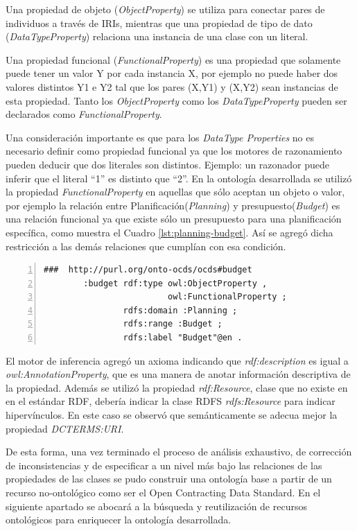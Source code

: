 Una propiedad de objeto (\textit{ObjectProperty}) se utiliza para conectar pares de individuos a través de IRIs, mientras que una propiedad de tipo de dato (\textit{DataTypeProperty}) relaciona una instancia de una clase con un literal.

Una propiedad funcional (\textit{FunctionalProperty}) es una propiedad que solamente puede tener un valor Y por cada instancia X, por ejemplo no puede haber dos valores distintos Y1 e Y2 tal que los pares (X,Y1) y (X,Y2) sean instancias de esta propiedad. Tanto los \textit{ObjectProperty} como los \textit{DataTypeProperty} pueden ser declarados como \textit{FunctionalProperty}.

Una consideración importante es que para los \textit{DataType Properties} no es necesario definir como propiedad funcional ya que los motores de razonamiento pueden deducir que dos literales son distintos. Ejemplo: un razonador puede inferir que  el literal “1” es distinto que “2”.
En la ontología desarrollada se utilizó la propiedad \textit{FunctionalProperty} en aquellas que sólo aceptan un objeto o valor, por ejemplo la relación entre Planificación(\textit{Planning}) y presupuesto(\textit{Budget}) es una relación funcional ya que existe sólo un presupuesto para una planificación específica, como muestra el Cuadro \ref{lst:planning-budget}. Así se agregó dicha restricción a las demás relaciones que cumplían con esa condición.\hfill \break

\noindent\begin{minipage}[c]{\textwidth}
    \begin{lstlisting}[captionpos=b, caption=Relación Funcional entre Planificación y presupuesto, label={lst:planning-budget},  numbers=left,  numberstyle=\tiny\color{mygray},frame=single]
        ###  http://purl.org/onto-ocds/ocds#budget
        :budget rdf:type owl:ObjectProperty ,
                         owl:FunctionalProperty ;
                rdfs:domain :Planning ;
                rdfs:range :Budget ;
                rdfs:label "Budget"@en .   
    \end{lstlisting}

\end{minipage}


El motor de inferencia agregó un axioma indicando que \textit{rdf:description} es igual a \textit{owl:AnnotationProperty}, que es una manera de anotar información descriptiva de la propiedad. Además se utilizó la propiedad \textit{rdf:Resource}, clase que no existe en en el estándar RDF, debería indicar la clase RDFS \textit{ rdfs:Resource} para indicar hipervínculos. En este caso se observó que semánticamente se adecua mejor la propiedad \textit{DCTERMS:URI}.

De esta forma, una vez terminado el proceso de análisis exhaustivo, de corrección de inconsistencias y de especificar a un nivel más bajo las relaciones de las propiedades de las clases se pudo construir una ontología base a partir de un recurso no-ontológico como ser el Open Contracting Data Standard. En el siguiente apartado se abocará a la búsqueda y reutilización de recursos ontológicos para enriquecer la ontología desarrollada.
